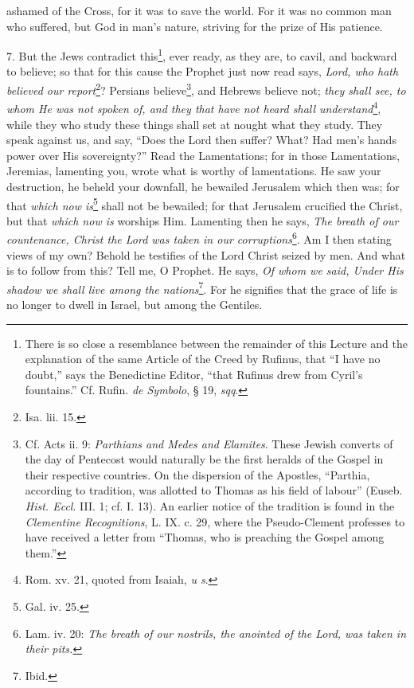 ashamed of the Cross, for it was to save the world. For it was no common man who suffered, but God in man’s nature, striving for the prize of His patience.

7. But the Jews contradict this\footnote{There is so close a resemblance between the remainder of this Lecture and the explanation of the same Article of the Creed by Rufinus, that “I have no doubt,” says the Benedictine Editor, “that Rufinus drew from Cyril’s fountains.” Cf. Rufin. \emph{de Symbolo}, § 19, \emph{sqq}.}, ever ready, as they are, to cavil, and backward to believe; so that for this cause the Prophet just now read says, \emph{Lord, who hath believed our report}\footnote{Isa. lii. 15.}? Persians believe\footnote{Cf. Acts ii. 9: \emph{Parthians and Medes and Elamites}. These Jewish converts of the day of Pentecost would naturally be the first heralds of the Gospel in their respective countries. On the dispersion of the Apostles, “Parthia, according to tradition, was allotted to Thomas as his field of labour” (Euseb. \emph{Hist. Eccl}. III. 1; cf. I. 13). An earlier notice of the tradition is found in the \emph{Clementine Recognitions}, L. IX. c. 29, where the Pseudo-Clement professes to have received a letter from “Thomas, who is preaching the Gospel among them.”}, and Hebrews believe not; \emph{they shall see, to whom He was not spoken of, and they that have not heard shall understand}\footnote{Rom. xv. 21, quoted from Isaiah, \emph{u s}.}, while they who study these things shall set at nought what they study. They speak against us, and say, “Does the Lord then suffer? What? Had men’s hands power over His sovereignty?” Read the Lamentations; for in those Lamentations, Jeremias, lamenting you, wrote what is worthy of lamentations. He saw your destruction, he beheld your downfall, he bewailed Jerusalem which then was; for that \emph{which now is}\footnote{Gal. iv. 25.} shall not be bewailed; for that Jerusalem crucified the Christ, but that \emph{which now is} worships Him. Lamenting then he says, \emph{The breath of our countenance, Christ the Lord was taken in our corruptions}\footnote{Lam. iv. 20: \emph{The breath of our nostrils, the anointed of the Lord, was taken in their pits.}}. Am I then stating views of my own? Behold he testifies of the Lord Christ seized by men. And what is to follow from this? Tell me, O Prophet. He says, \emph{Of whom we said, Under His shadow we shall live among the nations}\footnote{Ibid.}. For he signifies that the grace of life is no longer to dwell in Israel, but among the Gentiles.

